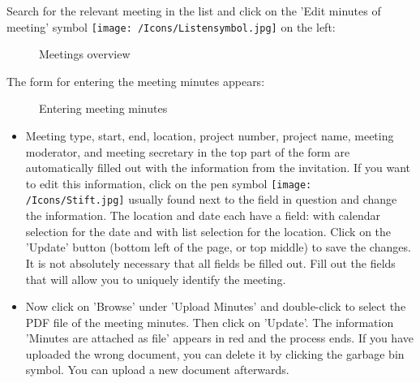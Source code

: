 \vspace{6.5cm} 

Search for the relevant meeting in the list and click on the 'Edit minutes of meeting' symbol \texttt{[image: /Icons/Listensymbol.jpg]}  on the left:

\begin{figure}[H]
\caption{Meetings overview}
\end{figure}

\vspace{\baselineskip}

The form for entering the meeting minutes appears:

\begin{figure}[H]
\caption{Entering meeting minutes}
\end{figure}

\begin{itemize}
\item
Meeting type, start, end, location, project number, project name, meeting moderator, and meeting secretary in the top part of the form are automatically filled out with the information from the invitation. If you want to edit this information, click on the pen symbol \texttt{[image: /Icons/Stift.jpg]}  usually found next to the field in question and change the information. The location and date  each have a field: with calendar selection for the date and with list selection for the location. Click on the 'Update' button  (bottom left of the page, or top middle) to save the changes. It is not absolutely necessary that all fields be filled out. Fill out the fields that will allow you to uniquely identify the meeting.
\item
Now click on 'Browse'  under 'Upload Minutes' and double-click to select the PDF file of the meeting minutes. Then click on 'Update'. The information 'Minutes are attached as file' appears in red  and the process ends. If you have uploaded the wrong document, you can delete it by clicking the garbage bin symbol. You can upload a new document afterwards.
\end{itemize}

